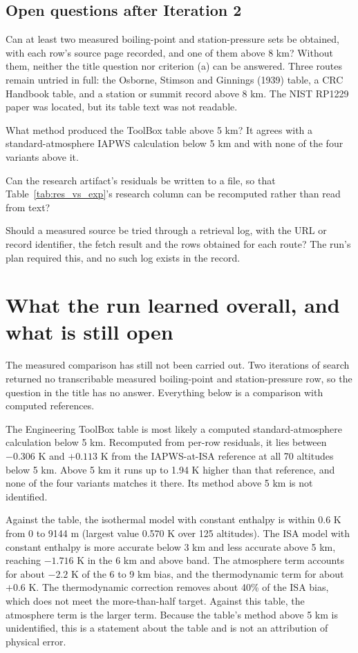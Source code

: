 \documentclass[11pt,letterpaper]{article}
\begin{document}
\subsection{Open questions after Iteration 2}

Can at least two measured boiling-point and station-pressure sets be obtained, with each row's source page recorded, and one of them above 8 km? Without them, neither the title question nor criterion (a) can be answered. Three routes remain untried in full: the Osborne, Stimson and Ginnings (1939) table, a CRC Handbook table, and a station or summit record above 8 km. The NIST RP1229 paper was located, but its table text was not readable.

What method produced the ToolBox table above 5 km? It agrees with a standard-atmosphere IAPWS calculation below 5 km and with none of the four variants above it.

Can the research artifact's residuals be written to a file, so that Table~\ref{tab:res_vs_exp}'s research column can be recomputed rather than read from text?

Should a measured source be tried through a retrieval log, with the URL or record identifier, the fetch result and the rows obtained for each route? The run's plan required this, and no such log exists in the record.

\section{What the run learned overall, and what is still open}

The measured comparison has still not been carried out. Two iterations of search returned no transcribable measured boiling-point and station-pressure row, so the question in the title has no answer. Everything below is a comparison with computed references.

The Engineering ToolBox table is most likely a computed standard-atmosphere calculation below 5 km. Recomputed from per-row residuals, it lies between $-0.306$ K and $+0.113$ K from the IAPWS-at-ISA reference at all 70 altitudes below 5 km. Above 5 km it runs up to 1.94 K higher than that reference, and none of the four variants matches it there. Its method above 5 km is not identified.

Against the table, the isothermal model with constant enthalpy is within 0.6 K from 0 to 9144 m (largest value 0.570 K over 125 altitudes). The ISA model with constant enthalpy is more accurate below 3 km and less accurate above 5 km, reaching $-1.716$ K in the 6 km and above band. The atmosphere term accounts for about $-2.2$ K of the 6 to 9 km bias, and the thermodynamic term for about $+0.6$ K. The thermodynamic correction removes about 40\% of the ISA bias, which does not meet the more-than-half target. Against this table, the atmosphere term is the larger term. Because the table's method above 5 km is unidentified, this is a statement about the table and is not an attribution of physical error.
\end{document}
